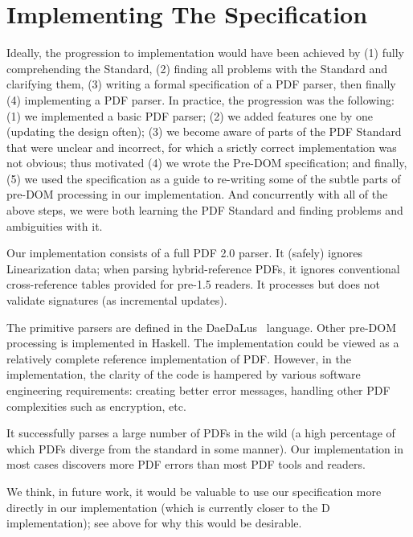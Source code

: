 \section{Implementing The Specification}
\label{sec:implementation}

Ideally, the progression to implementation would have been achieved by
%
(1) fully comprehending the Standard,
(2) finding all problems with the Standard and clarifying them,
(3) writing a formal specification of a PDF parser,
then finally (4) implementing a PDF parser.
%
In practice, the progression was the following:
%
(1) we implemented a basic PDF parser;
(2) we added features one by one (updating the design often);
(3) we become aware of parts of the PDF Standard that were unclear and
incorrect, for which a srictly correct implementation was not obvious;
thus motivated
(4) we wrote the Pre-DOM specification; and finally,
(5) we used the specification as a guide to re-writing some of
the subtle parts of pre-DOM processing in our implementation.
%
And concurrently with all of the above steps, we were both learning the PDF
Standard and finding problems and ambiguities with it.

Our implementation consists of a full PDF 2.0 parser.  It (safely) ignores
Linearization data;
%
when parsing hybrid-reference PDFs, it ignores conventional
cross-reference tables provided for pre-1.5 readers.
%
It processes but does not validate signatures (as incremental
updates).

The primitive parsers are defined in the DaeDaLus~\cite{daedalusrepo}
language.
%
Other pre-DOM processing is implemented in Haskell.
%
The implementation could be viewed as a relatively complete reference 
implementation of PDF.
However, in the implementation, 
the clarity of the code is hampered by various software engineering
requirements:
creating better error messages,
handling other PDF complexities such as encryption,
etc.

It successfully parses a large number of PDFs in the wild
(a high percentage of which PDFs diverge from the standard in some manner).
Our implementation in most cases discovers more PDF errors than
most PDF tools and readers.

We think, in future work, it would be valuable to use our specification more
directly in our implementation (which is currently closer to the D
implementation);
%
see  above for why this would be
desirable.


